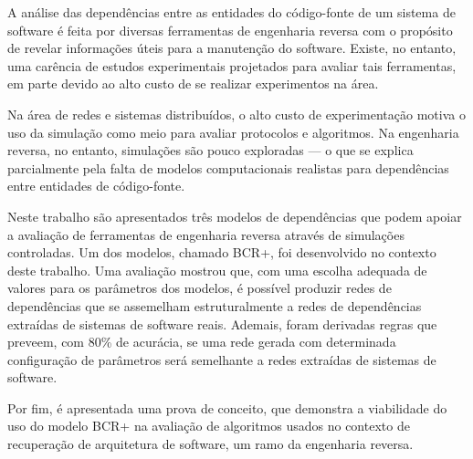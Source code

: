 
A análise das dependências entre as entidades do código-fonte de um sistema de software é feita por diversas ferramentas de engenharia reversa com o propósito de revelar informações úteis para a manutenção do software. Existe, no entanto, uma carência de estudos experimentais projetados para avaliar tais ferramentas, em parte devido ao alto custo de se realizar experimentos na área. 

Na área de redes e sistemas distribuídos, o alto custo de experimentação motiva o uso da simulação como meio para avaliar protocolos e algoritmos. Na engenharia reversa, no entanto, simulações são pouco exploradas --- o que se explica parcialmente pela falta de modelos computacionais realistas para dependências entre entidades de código-fonte.

Neste trabalho são apresentados três modelos de dependências que podem apoiar a avaliação de ferramentas de engenharia reversa através de simulações controladas. Um dos modelos, chamado BCR+, foi desenvolvido no contexto deste trabalho. Uma avaliação mostrou que, com uma escolha adequada de valores para os parâmetros dos modelos, é possível produzir redes de dependências que se assemelham estruturalmente a redes de dependências extraídas de sistemas de software reais. Ademais, foram derivadas regras que preveem, com 80\% de acurácia, se uma rede gerada com determinada configuração de parâmetros será semelhante a redes extraídas de sistemas de software.

Por fim, é apresentada uma prova de conceito, que demonstra a viabilidade do uso do modelo BCR+ na avaliação de algoritmos usados no contexto de recuperação de arquitetura de software, um ramo da engenharia reversa.




